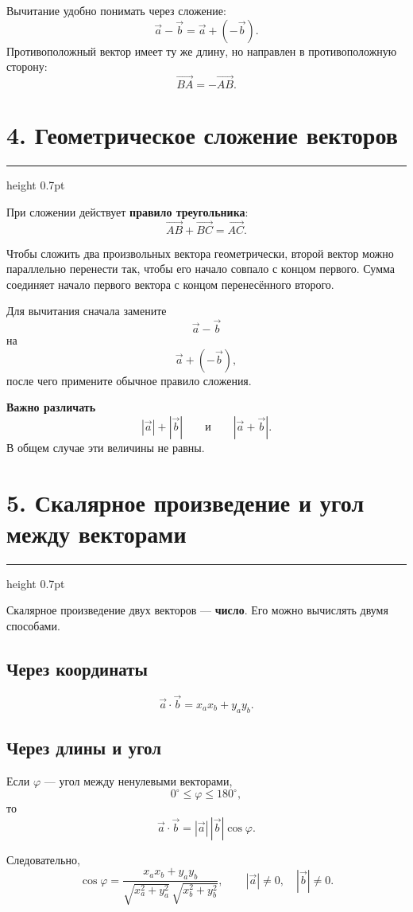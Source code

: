 \documentclass[a4paper,12pt]{article}
\newcommand{\vect}[1]{\vec{#1}}
\newcommand{\sectionrule}{%
  \par\vspace{1mm}%
  {\color{accent!60}\hrule height 0.7pt}%
  \vspace{3mm}%
}
\begin{document}
Вычитание удобно понимать через сложение:
\[
\boxed{\vect a-\vect b=\vect a+(-\vect b)}.
\]
Противоположный вектор имеет ту же длину, но направлен в противоположную сторону:
\[
\overrightarrow{BA}=-\overrightarrow{AB}.
\]

\section*{4. Геометрическое сложение векторов}
\sectionrule

При сложении действует \textbf{правило треугольника}:
\[
\boxed{
\overrightarrow{AB}+\overrightarrow{BC}=\overrightarrow{AC}
}.
\]

Чтобы сложить два произвольных вектора геометрически, второй вектор можно параллельно перенести так,
чтобы его начало совпало с концом первого. Сумма соединяет начало первого вектора с концом перенесённого второго.

Для вычитания сначала замените
\[
\vect a-\vect b
\]
на
\[
\vect a+(-\vect b),
\]
после чего примените обычное правило сложения.

\textbf{Важно различать}
\[
|\vect a|+|\vect b|
\qquad\text{и}\qquad
|\vect a+\vect b|.
\]
В общем случае эти величины не равны.

\section*{5. Скалярное произведение и угол между векторами}
\sectionrule

Скалярное произведение двух векторов --- \textbf{число}. Его можно вычислять двумя способами.

\subsection*{Через координаты}

\[
\boxed{
\vect a\cdot\vect b
=
x_ax_b+y_ay_b
}.
\]

\subsection*{Через длины и угол}

Если \(\varphi\) --- угол между ненулевыми векторами,
\[
0^\circ\le\varphi\le180^\circ,
\]
то
\[
\boxed{
\vect a\cdot\vect b
=
|\vect a|\,|\vect b|\cos\varphi
}.
\]

Следовательно,
\[
\boxed{
\displaystyle
\cos\varphi
=
\frac{x_ax_b+y_ay_b}
{\sqrt{x_a^2+y_a^2}\,\sqrt{x_b^2+y_b^2}}
},
\qquad
|\vect a|\ne0,
\quad
|\vect b|\ne0.
\]
\end{document}

